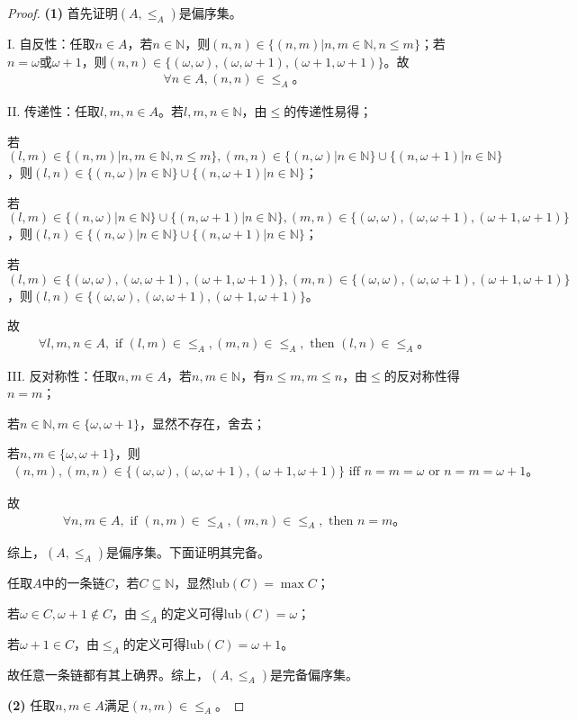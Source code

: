 \documentclass[12pt]{article}
\newcommand{\N}{\mathbb{N}}
\newcommand{\nn}{\{(n,m) | n,m \in \mathbb{N}, n \leq m\}}
\newcommand{\nw}{\{(n,\omega) | n \in \mathbb{N}\} \cup \{(n,\omega+1) | n \in \mathbb{N}\}}
\newcommand{\ww}{\{(\omega,\omega),(\omega,\omega+1),(\omega+1,\omega+1)\}}
\newcommand{\lub}{\textrm{lub}}
\begin{document}
    \begin{proof}

      \textbf{(1)} 首先证明$(A,\leq_A)$是偏序集。

        I. 自反性：任取$n \in A$，若$n\in\N$，则$(n,n) \in \nn$；若$n=\omega$或$\omega+1$，则$(n,n) \in \ww$。故
        \begin{gather*}
          \forall n \in A, (n,n) \in \leq_A。
        \end{gather*}

        II. 传递性：任取$l,m,n \in A$。若$l,m,n \in \N$，由$\leq$的传递性易得；

        若$(l,m) \in \nn, (m,n) \in \nw$，则$(l,n)\in\nw$；

        若$(l,m)\in\nw,(m,n)\in\ww$，则$(l,n)\in\nw$；

        若$(l,m)\in\ww,(m,n)\in\ww$，则$(l,n)\in\ww$。

        故
        \begin{gather*}
          \forall l,m,n \in A,\text{ if }(l,m)\in\leq_A,(m,n)\in\leq_A,\text{ then }(l,n)\in\leq_A。
        \end{gather*}

        III. 反对称性：任取$n,m\in A$，若$n,m\in\N$，有$n\leq m,m \leq n$，由$\leq$的反对称性得$n=m$；

        若$n\in\N,m\in\{\omega,\omega+1\}$，显然不存在，舍去；

        若$n,m\in\{\omega,\omega+1\}$，则
        \begin{gather*}
          (n,m),(m,n)\in\ww\text{ iff }n=m=\omega\text{ or }n=m=\omega+1。
        \end{gather*}

        故
        \begin{gather*}
          \forall n,m \in A,\text{ if }(n,m)\in\leq_A,(m,n)\in\leq_A,\text{ then }n=m。
        \end{gather*}

        综上，$(A,\leq_A)$是偏序集。下面证明其完备。

        任取$A$中的一条链$C$，若$C\subseteq\N$，显然$\lub(C)=\max C$；

        若$\omega \in C, \omega+1 \notin C$，由$\leq_A$的定义可得$\lub(C)=\omega$；

        若$\omega+1\in C$，由$\leq_A$的定义可得$\lub(C)=\omega+1$。

        故任意一条链都有其上确界。综上，$(A,\leq_A)$是完备偏序集。

      \textbf{(2)} 任取$n,m\in A$满足$(n,m)\in\leq_A$。


\end{proof}
\end{document}
